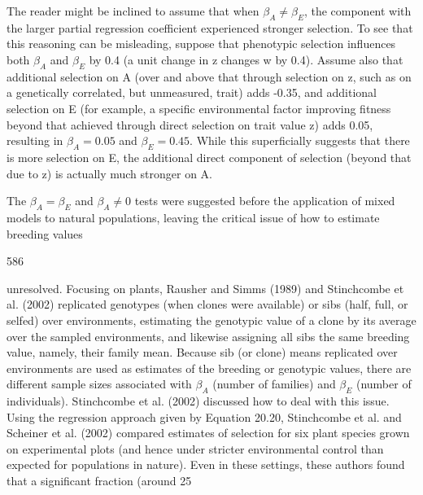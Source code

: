 \documentclass{article}
\begin{document}
The reader might be inclined to assume that when  $ \beta_A \neq \beta_E $, the component with the larger partial regression coefficient experienced stronger selection. To see that this reasoning can be misleading, suppose that phenotypic selection influences both  $ \beta_A $ and  $ \beta_E $ by 0.4 (a unit change in z changes w by 0.4). Assume also that additional selection on A (over and above that through selection on z, such as on a genetically correlated, but unmeasured, trait) adds -0.35, and additional selection on E (for example, a specific environmental factor improving fitness beyond that achieved through direct selection on trait value z) adds 0.05, resulting in  $ \beta_A = 0.05 $ and  $ \beta_E = 0.45 $. While this superficially suggests that there is more selection on E, the additional direct component of selection (beyond that due to z) is actually much stronger on A.

The  $ \beta_A = \beta_E $ and  $ \beta_A \neq 0 $ tests were suggested before the application of mixed models to natural populations, leaving the critical issue of how to estimate breeding values

586

unresolved. Focusing on plants, Rausher and Simms (1989) and Stinchcombe et al. (2002) replicated genotypes (when clones were available) or sibs (half, full, or selfed) over environments, estimating the genotypic value of a clone by its average over the sampled environments, and likewise assigning all sibs the same breeding value, namely, their family mean. Because sib (or clone) means replicated over environments are used as estimates of the breeding or genotypic values, there are different sample sizes associated with  $ \beta_{A} $ (number of families) and  $ \beta_{E} $ (number of individuals). Stinchcombe et al. (2002) discussed how to deal with this issue. Using the regression approach given by Equation 20.20, Stinchcombe et al. and Scheiner et al. (2002) compared estimates of selection for six plant species grown on experimental plots (and hence under stricter environmental control than expected for populations in nature). Even in these settings, these authors found that a significant fraction (around 25%
\end{document}
